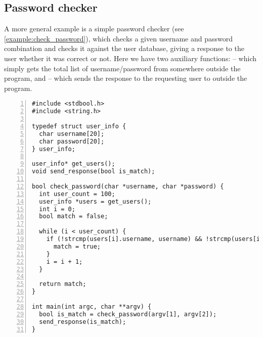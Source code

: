 \subsection{Password checker}
A more general example is a simple password checker (see \cref{example:check_password}), which checks a given username and password combination and checks it against the user database, giving a response to the user whether it was correct or not.
Here we have two auxiliary functions:  -- which simply gets the total list of username/password from somewhere outside the program, and  -- which sends the response to the requesting user to outside the program.

\begin{lstlisting}[float, style=dlmc, numbers=left, caption={Password checker}, label=example:check_password]
#include <stdbool.h>
#include <string.h>

typedef struct user_info {
  char username[20];
  char password[20];
} user_info;

user_info* get_users();
void send_response(bool is_match);

bool check_password(char *username, char *password) {
  int user_count = 100;
  user_info *users = get_users();
  int i = 0;
  bool match = false;

  while (i < user_count) {
    if (!strcmp(users[i].username, username) && !strcmp(users[i].password, password)) {
      match = true;
    }
    i = i + 1;
  }

  return match;
}

int main(int argc, char **argv) {
  bool is_match = check_password(argv[1], argv[2]);
  send_response(is_match);
}
\end{lstlisting}
